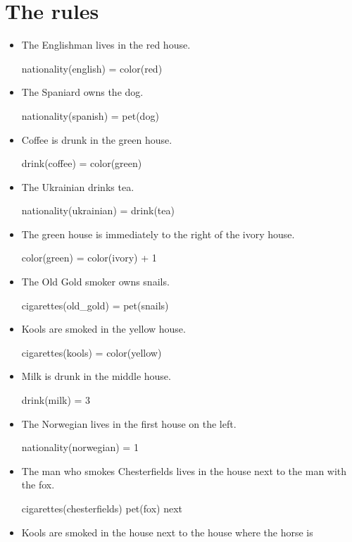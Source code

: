 \documentclass{article}
\begin{document}
\section{The rules}
\begin{itemize}
\item The Englishman lives in the red house.
  \begin{zed}
    nationality(english) = color(red)
  \end{zed}
\item The Spaniard owns the dog.
  \begin{zed}
    nationality(spanish) = pet(dog)
  \end{zed}
\item Coffee is drunk in the green house.
  \begin{zed}
    drink(coffee) = color(green)
  \end{zed}
\item The Ukrainian drinks tea.
  \begin{zed}
    nationality(ukrainian) = drink(tea)
  \end{zed}
\item The green house is immediately to the right of the ivory house.
  \begin{zed}
    color(green) = color(ivory) + 1
  \end{zed}
\item The Old Gold smoker owns snails.
  \begin{zed}
    cigarettes(old\_gold) = pet(snails)
  \end{zed}
\item Kools are smoked in the yellow house.
  \begin{zed}
    cigarettes(kools) = color(yellow)
  \end{zed}
\item Milk is drunk in the middle house.
  \begin{zed}
    drink(milk) = 3
  \end{zed}
\item The Norwegian lives in the first house on the left.
  \begin{zed}
    nationality(norwegian) = 1
  \end{zed}
\item The man who smokes Chesterfields lives in the house next to the
  man with the fox.
  \begin{zed}
    cigarettes(chesterfields) \mapsto pet(fox) \in next
  \end{zed}
\item Kools are smoked in the house next to the house where the horse is

\end{itemize}
\end{document}
